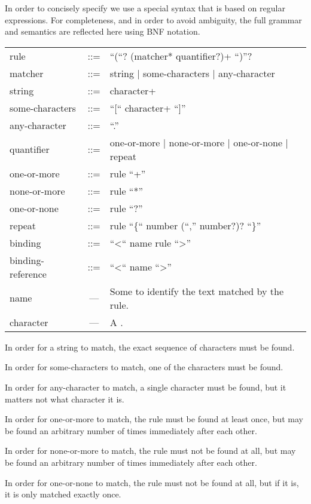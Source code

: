 In order to concisely specify  we use a special syntax that is based on regular expressions. For completeness, and in order to avoid ambiguity, the full grammar and semantics are reflected here using BNF notation. \\

\begin{tabular}{lcl}
rule &::=& ``(``? (matcher* quantifier?)+ ``)''? \\
matcher &::=& string | some-characters | any-character \\
string &::=& character+ \\
some-characters &::=& ``[`` character+ ``]'' \\
any-character &::=& ``.'' \\
quantifier &::=& one-or-more | none-or-more | one-or-none | repeat \\
one-or-more &::=& rule ``+'' \\
none-or-more &::=& rule ``*'' \\
one-or-none &::=& rule ``?'' \\
repeat &::=& rule ``\{`` number (``,'' number?)? ``\}'' \\
binding &::=& ``<`` name rule ``>'' \\
binding-reference &::=& ``<`` name ``>'' \\
name &---& Some \g{alphanumeric} \g{string} to identify the text matched by the rule. \\
character &---& A \g{character}. \\
\end{tabular}

In order for a string to match, the exact sequence of characters must be found.

In order for some-characters to match, one of the characters must be found.

In order for any-character to match, a single character must be found, but it matters not what character it is.

In order for one-or-more to match, the rule must be found at least once, but may be found an arbitrary number of times immediately after each other.

In order for none-or-more to match, the rule must not be found at all, but may be found an arbitrary number of times immediately after each other.

In order for one-or-none to match, the rule must not be found at all, but if it is, it is only matched exactly once.

